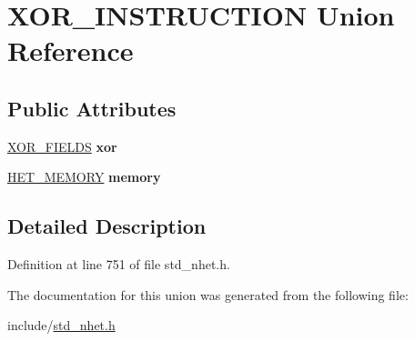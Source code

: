 \hypertarget{unionXOR__INSTRUCTION}{}\section{X\+O\+R\+\_\+\+I\+N\+S\+T\+R\+U\+C\+T\+I\+ON Union Reference}
\label{unionXOR__INSTRUCTION}
\subsection*{Public Attributes}
\begin{DoxyCompactItemize}
\item 
\mbox{\label{unionXOR__INSTRUCTION_a964d73935b539ac2c02df876fbba8620}} 
\mbox{\hyperlink{structXOR__format}{X\+O\+R\+\_\+\+F\+I\+E\+L\+DS}} {\bfseries xor}
\item 
\mbox{\label{unionXOR__INSTRUCTION_a515e16be52644b6b09af7d85c78fd289}} 
\mbox{\hyperlink{structmemory__format}{H\+E\+T\+\_\+\+M\+E\+M\+O\+RY}} {\bfseries memory}
\end{DoxyCompactItemize}


\subsection{Detailed Description}


Definition at line 751 of file std\+\_\+nhet.\+h.



The documentation for this union was generated from the following file\+:\begin{DoxyCompactItemize}
\item 
include/\mbox{\hyperlink{std__nhet_8h}{std\+\_\+nhet.\+h}}\end{DoxyCompactItemize}

